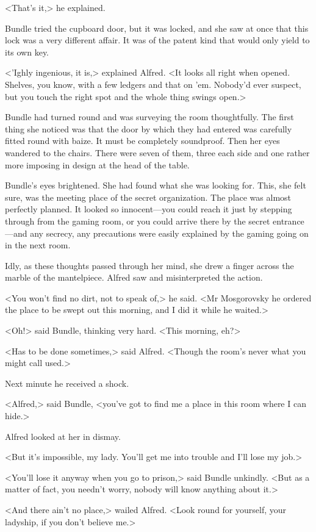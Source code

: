 <That's it,> he explained.

Bundle tried the cupboard door, but it was locked, and she saw at once that this lock was a very different affair. It was of the patent kind that would only yield to its own key.

<'Ighly ingenious, it is,> explained Alfred. <It looks all right when opened. Shelves, you know, with a few ledgers and that on 'em. Nobody'd ever suspect, but you touch the right spot and the whole thing swings open.>

Bundle had turned round and was surveying the room thoughtfully. The first thing she noticed was that the door by which they had entered was carefully fitted round with baize. It must be completely soundproof. Then her eyes wandered to the chairs. There were seven of them, three each side and one rather more imposing in design at the head of the table.

Bundle's eyes brightened. She had found what she was looking for. This, she felt sure, was the meeting place of the secret organization. The place was almost perfectly planned. It looked so innocent—you could reach it just by stepping through from the gaming room, or you could arrive there by the secret entrance—and any secrecy, any precautions were easily explained by the gaming going on in the next room.

Idly, as these thoughts passed through her mind, she drew a finger across the marble of the mantelpiece. Alfred saw and misinterpreted the action.

<You won't find no dirt, not to speak of,> he said. <Mr Mosgorovsky he ordered the place to be swept out this morning, and I did it while he waited.>

<Oh!> said Bundle, thinking very hard. <This morning, eh?>

<Has to be done sometimes,> said Alfred. <Though the room's never what you might call used.>

Next minute he received a shock.

<Alfred,> said Bundle, <you've got to find me a place in this room where I can hide.>

Alfred looked at her in dismay.

<But it's impossible, my lady. You'll get me into trouble and I'll lose my job.>

<You'll lose it anyway when you go to prison,> said Bundle unkindly. <But as a matter of fact, you needn't worry, nobody will know anything about it.>

<And there ain't no place,> wailed Alfred. <Look round for yourself, your ladyship, if you don't believe me.>

